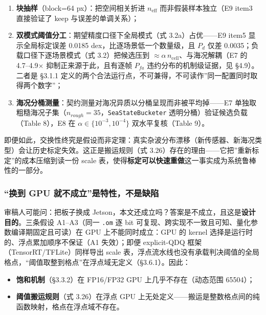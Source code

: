 \begin{enumerate}
\def\labelenumi{\arabic{enumi}.}
\tightlist
\item
  \textbf{块抽样}（block=64 px）：把空间相关折进 \(n_{\mathrm{eff}}\)
  而非假装样本独立（E9 item3 直接验证了 keep 与误差的单调关系）；
\item
  \textbf{双模式阈值分工}：期望精度口径下全局模式（式 3.2a）占优------E9
  item5 显示全局标定误差 0.0185 dex，比逐场景低一个数量级，且 \(P_d\)
  仅差 0.0035；负载口径下逐场景模式（式 3.2）把候选压到
  \(\approx\alpha\,n_{\mathrm{cell}}\)、与海况解耦（E7 的 4.7--4.9×
  抑制正来源于此，且有逐帧 \(P_{fa}\) 违约分布的机制级证据，见
  §4.9）。二者是 §3.1.1
  定义的两个合法运行点，不可兼得，不可读作''同一配置同时取得两个数字''；
\item
  \textbf{海况分桶测量}：契约测量对海况异质以分桶呈现而非被平均掉------E7
  单独取粗糙海况子集（\(n_{rough}=35\)，\texttt{SeaStateBucketer}
  透明分桶）验证候选负载（Table 8），E8 在
  \(\alpha\in\{10^{-3},10^{-4}\}\) 双水平复核（Table 9）。
\end{enumerate}

即便如此，交换性终究是假设而非定理：真实杂波分布漂移（新传感器、新海况类型）会让历史标定失效。这正是搬运规则（式
3.26）存在的理由------它把''重新标定''的成本压缩到读一份 scale
表，使得\textbf{标定可以快速重做}这一事实成为系统鲁棒性的一部分。

\subsubsection{``换到 GPU
就不成立''是特性，不是缺陷}\label{ux6362ux5230-gpu-ux5c31ux4e0dux6210ux7acbux662fux7279ux6027ux4e0dux662fux7f3aux9677}

审稿人可能问：把板子换成
Jetson，本文还成立吗？答案是不成立，且这是\textbf{设计目的}。三条假设
A1--A3（同一 \texttt{.om} 逐 bit
可复现、跨实现不一致且可知、量化参数编译期固定且可读）在 GPU
上不能同时成立：GPU 的 kernel 选择是运行时的、浮点累加顺序不保证（A1
失效）；即便 explicit-QDQ 框架（TensorRT/TFLite）同样导出 scale
表，浮点流水线也没有承载判决阈值的全局格点，``阈值取整到格点''在浮点域无定义（§3.6.1）。因此：

\begin{itemize}
\tightlist
\item
  \textbf{饱和机制}（§3.3.2）在 FP16/FP32 GPU 上几乎不存在（动态范围
  65504）；
\item
  \textbf{阈值搬运规则}（式 3.26）在浮点 GPU
  上无处定义------搬运是整数格点间的纯函数映射，格点在浮点域不存在。
\end{itemize}

